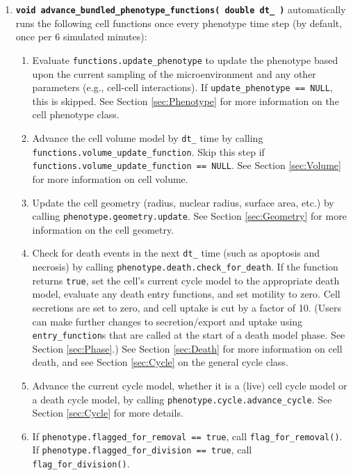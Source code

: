 \documentclass[12pt]{article}
\renewcommand{\v}{\verb}
\newcommand{\smallcode}[1]{\textbf{\texttt{#1}}}
\begin{document}
\begin{enumerate}
\item 
\smallcode{void advance\_bundled\_phenotype\_functions( double dt\_ )} 
automatically runs the following cell functions once every 
phenotype time step (by default, once per 6 simulated minutes): 

\begin{enumerate}
\item 
Evaluate 
\v|functions.update_phenotype| to update the phenotype based upon 
the current sampling of the microenvironment and any other parameters 
(e.g., cell-cell interactions). If \hfill\break
\v|update_phenotype == NULL|, this is skipped. See 
Section \ref{sec:Phenotype} for more information on the cell 
phenotype class. 

\item 
Advance the cell volume model by \v|dt_| time by calling 
\v|functions.volume_update_function|. Skip this step if 
\v|functions.volume_update_function == NULL|. See Section 
\ref{sec:Volume} for more information on cell volume. 

\item 
Update the cell geometry (radius, nuclear radius, surface area, etc.) 
by calling \hfill\break
\v|phenotype.geometry.update|. See Section \ref{sec:Geometry} for 
more information on the cell geometry. 

\item 
Check for death events in the next \v|dt_| time (such as apoptosis 
and necrosis) by calling \hfill\break
\v|phenotype.death.check_for_death|. If the function returns 
\v|true|, set the cell's current cycle model to the appropriate 
death model, evaluate any death entry functions, and 
set motility to zero. Cell secretions are set to zero, 
and cell uptake is cut by a factor of 10. 
(Users can make further changes to secretion/export and uptake 
using \v|entry_function|s that are called at the start 
of a death model phase. See Section \ref{sec:Phase}.) 
See Section \ref{sec:Death} for more information on cell death, 
and see Section \ref{sec:Cycle} on the general cycle class. 

\item 
Advance the current cycle model, whether it is a (live) cell cycle 
model or a death cycle model, by calling 
\v|phenotype.cycle.advance_cycle|. See Section \ref{sec:Cycle} for 
more details. 

\item 
If \v|phenotype.flagged_for_removal == true|, call 
\v|flag_for_removal()|. \hfill\break If 
\v|phenotype.flagged_for_division == true|, call 
\v|flag_for_division()|. 
\end{enumerate}


\end{enumerate}
\end{document}
